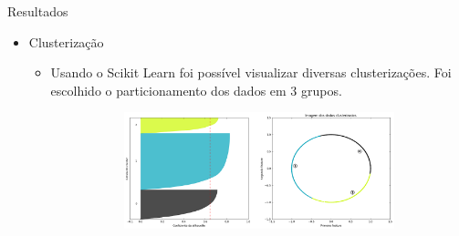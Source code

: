 \documentclass[final,hyperref={pdfpagelabels=false, brazil}]{beamer}
\let\olditem=\item%
\renewcommand{\item}{\olditem \justifying}%
\begin{document}
\begin{frame}[t]
\begin{columns}[t]
\begin{column}{.465\textwidth}
     


\begin{block}{Resultados}

\begin{itemize}
\item Clusterização

\begin{itemize}
\item Usando o Scikit Learn foi possível visualizar diversas clusterizações. Foi escolhido o particionamento dos dados em 3 grupos.


\begin{figure}[t!]
    \centering
        \caption{Resultados da clusterização}
    \begin{subfigure}[t]{0.55\textwidth}
        \centering
\includegraphics[width=1\linewidth]{silhoute3.png}


\end{subfigure}
\end{figure}
\end{itemize}
\end{itemize}
\end{block}
\end{column}
\end{columns}
\end{frame}
\end{document}
